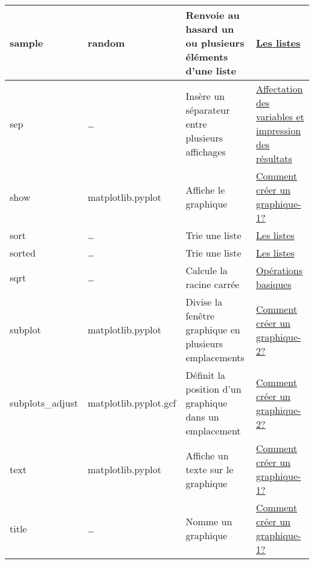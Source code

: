 \begin{longtable}{@{\extracolsep{\fill}}|p{} | p{} |p{} | p{}|@{}}
sample
 & 
random
 & 
Renvoie au hasard un ou plusieurs éléments d'une liste
 & 
\href{https://pyspc.readthedocs.io/fr/latest/05-bases/08-listes.html}{Les
listes}
\\ \hline

sep
 & 
\ldots{}
 & 
Insère un séparateur entre plusieurs affichages
 & 
\href{https://pyspc.readthedocs.io/fr/latest/05-bases/02-variables_input_print.html}{Affectation
des variables et impression des résultats}
\\ \hline

show
 & 
matplotlib.pyplot
 & 
Affiche le graphique
 & 
\href{https://pyspc.readthedocs.io/fr/latest/05-bases/10-graphiques_partie_1.html}{Comment
créer un graphique-1?}
\\ \hline

sort
 & 
\ldots{}
 & 
Trie une liste
 & 
\href{https://pyspc.readthedocs.io/fr/latest/05-bases/08-listes.html}{Les
listes}
\\ \hline

sorted
 & 
\ldots{}
 & 
Trie une liste
 & 
\href{https://pyspc.readthedocs.io/fr/latest/05-bases/08-listes.html}{Les
listes}
\\ \hline

sqrt
 & 
\ldots{}
 & 
Calcule la racine carrée
 & 
\href{https://pyspc.readthedocs.io/fr/latest/05-bases/04-operations_basiques.html}{Opérations
basiques}
\\ \hline

subplot
 & 
matplotlib.pyplot
 & 
Divise la fenêtre graphique en plusieurs emplacements
 & 
\href{https://pyspc.readthedocs.io/fr/latest/05-bases/10-graphiques_partie_2.html}{Comment
créer un graphique-2?}
\\ \hline

subplots\_adjust
 & 
matplotlib.pyplot.gcf
 & 
Définit la position d'un graphique dans un emplacement
 & 
\href{https://pyspc.readthedocs.io/fr/latest/05-bases/10-graphiques_partie_2.html}{Comment
créer un graphique-2?}
\\ \hline

text
 & 
matplotlib.pyplot
 & 
Affiche un texte sur le graphique
 & 
\href{https://pyspc.readthedocs.io/fr/latest/05-bases/10-graphiques_partie_1.html}{Comment
créer un graphique-1?}
\\ \hline

title
 & 
\ldots{}
 & 
Nomme un graphique
 & 
\href{https://pyspc.readthedocs.io/fr/latest/05-bases/10-graphiques_partie_1.html}{Comment
créer un graphique-1?}
\\ \hline


\end{longtable}
